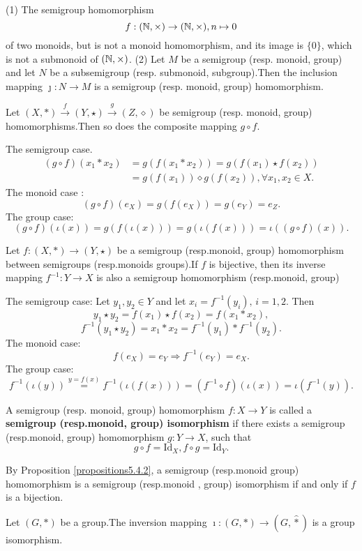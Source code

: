 \begin{remark}
    \quad
    \newline
    (1) The semigroup homomorphism
    $$f:(\mathbb{N}, \times)\rightarrow (\mathbb{N}, \times), n\mapsto 0$$
    of two monoids, but is not a monoid homomorphism, and its image is $\{0\}$,  which is not a submonoid of $(\mathbb{N}, \times)$.
    \newline
    (2) Let $M$ be a semigroup (resp. monoid, group) and let $N$ be a subsemigroup (resp. submonoid, subgroup).Then the inclusion mapping $\jmath :N\rightarrow M$ is a semigroup (resp. monoid,  group) homomorphism.
\end{remark}
\begin{propositionenv}\label{propositions5.4.2}
    Let $(X, *)\overset{f}{\rightarrow} (Y, \star)\overset{g}{\rightarrow}(Z, \diamond ) $ be semigroup (resp. monoid,  group) homomorphisms.Then so does the composite mapping $g\circ f$.
\end{propositionenv}
\begin{proofenv}
    The semigroup case.
        \begin{align*}
            (g\circ f)(x_1*x_2) & = g(f(x_1*x_2))  = g(f(x_1)\star f(x_2)) \\
            & = g(f(x_1))\diamond g(f(x_2)), \forall x_1, x_2\in X.
        \end{align*}
    The monoid case :
    $$(g\circ f)(e_X)=g(f(e_X))=g(e_Y)=e_Z.$$
    The group case:
    $$(g\circ f)(\iota(x))=g(f(\iota(x)))=g(\iota(f(x)))=\iota((g\circ f)(x)).$$
\end{proofenv}
\begin{propositionenv}
    Let $f:(X, *)\rightarrow (Y, \star)$ be a semigroup (resp.monoid,  group) homomorphism between semigroups (resp.monoids groups).If $f$ is bijective,  then its inverse mapping $f^{-1}:Y\rightarrow X$ is also a semigroup homomorphism (resp.monoid, group) 
\end{propositionenv}
\begin{proofenv}
    The semigroup case: Let $y_1, y_2\in Y$ and let $x_i=f^{-1}(y_i), \, i=1, 2$. Then 
    $$y_1\star y_2=f(x_1)\star f(x_2)=f(x_1*x_2), $$
    $$f^{-1}(y_1\star y_2)=x_1*x_2=f^{-1}(y_1)*f^{-1}(y_2).$$
    The monoid case:
    $$f(e_X)=e_Y\Rightarrow f^{-1}(e_Y)=e_X.$$
    The group case:
    $$f^{-1}(\iota(y))\overset{y=f(x)}{=}f^{-1}(\iota(f(x)))=(f^{-1}\circ f)(\iota(x))=\iota(f^{-1}(y)).$$
\end{proofenv}
\begin{definitionenv}
    A semigroup (resp. monoid,  group) homomorphism $f:X\rightarrow Y$ is called a \textbf{semigroup (resp.monoid, group) isomorphism} if there exists a semigroup (resp.monoid, group) homomorphism $g:Y\rightarrow X$,  such that 
    $$g\circ f=\mathrm{Id}_X, f\circ g=\mathrm{Id}_Y.$$
\end{definitionenv}
By Proposition \ref{propositions5.4.2},  a semigroup (resp.monoid group) homomorphism is a semigroup (resp.monoid , group) isomorphism if and only if $f$ is a bijection.
\begin{propositionenv}
    Let $(G, *)$ be a group.The inversion mapping $\imath :(G, *)\rightarrow(G, \hat{*})$ is a group isomorphism.
\end{propositionenv}
